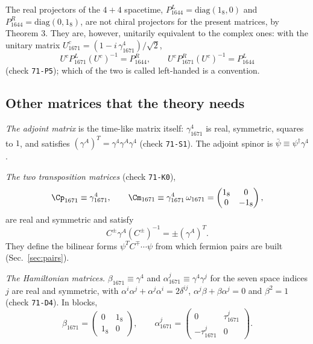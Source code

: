 The real projectors of the $4+4$ spacetime, $P_{1644}^{L}=\mathrm{diag}(1_8,0)$ and
$P_{1644}^{R}=\mathrm{diag}(0,1_8)$, are not chiral projectors for the present matrices, by
Theorem 3. They are, however, unitarily equivalent to the complex ones: with the unitary matrix
$U_{1671}^{c}=(1-i\,\gamma_{1671}^4)/\sqrt2$,
\begin{equation}
U^{c}P_{1671}^{L}(U^{c})^{-1}=P_{1644}^{R},\qquad U^{c}P_{1671}^{R}(U^{c})^{-1}=P_{1644}^{L}
\label{eq:Uc}
\end{equation}
(check \texttt{71-P5}); which of the two is called left-handed is a convention.

\subsection{Other matrices that the theory needs}
\label{sec:other}

\emph{The adjoint matrix} is the time-like matrix itself: $\gamma_{1671}^4$ is real, symmetric, squares
to $1$, and satisfies $(\gamma^A)^T=\gamma^4\gamma^A\gamma^4$ (check \texttt{71-S1}). The adjoint
spinor is $\bar\psi\equiv\psi^\dagger\gamma^4$.

\emph{The two transposition matrices} (check \texttt{71-K0}),
\begin{equation}
\Cp_{1671}\equiv\gamma_{1671}^4,\qquad\Cm_{1671}\equiv\gamma_{1671}^4\,\omega_{1671}=\begin{pmatrix}1_8&0\\0&-1_8\end{pmatrix},
\label{eq:C}
\end{equation}
are real and symmetric and satisfy
\begin{equation}
C^{\pm}\gamma^A(C^{\pm})^{-1}=\pm(\gamma^A)^T .
\label{eq:Ctranspose}
\end{equation}
They define the bilinear forms $\psi^TC^{\mp}\cdots\psi$ from which fermion pairs are built
(Sec.~\ref{sec:pairs}).

\emph{The Hamiltonian matrices.} $\beta_{1671}\equiv\gamma^4$ and $\alpha_{1671}^j\equiv\gamma^4\gamma^j$
for the seven space indices $j$ are real and symmetric, with
$\alpha^i\alpha^j+\alpha^j\alpha^i=2\delta^{ij}$, $\alpha^j\beta+\beta\alpha^j=0$ and $\beta^2=1$
(check \texttt{71-D4}). In blocks,
\begin{equation}
\beta_{1671}=\begin{pmatrix}0&1_8\\1_8&0\end{pmatrix},\qquad\alpha_{1671}^j=\begin{pmatrix}0&\tau_{1671}^j\\-\tau_{1671}^j&0\end{pmatrix}.
\label{eq:alphabeta}
\end{equation}

